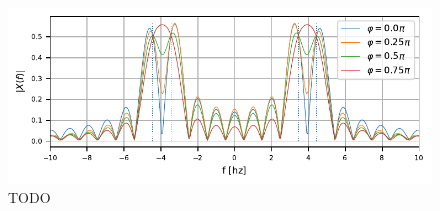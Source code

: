 \begin{figure}
    \centering
    \includegraphics{papers/sonogramm/images/twoharmphasediff.pdf}
    \caption{TODO
    \label{sonogramm:freqdiffdemo}
    }
\end{figure}


